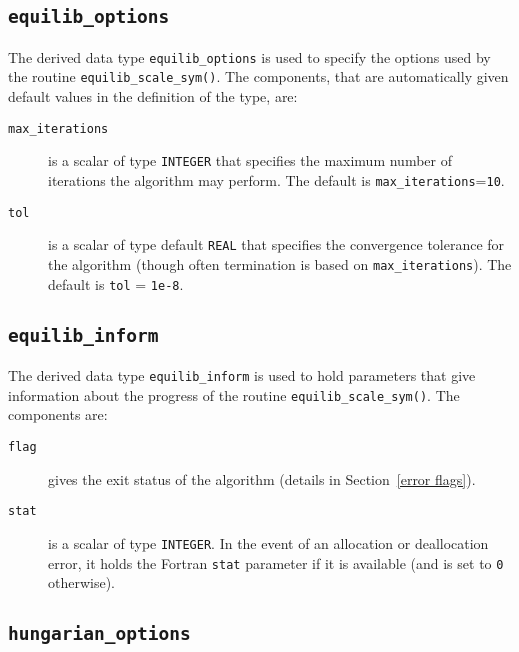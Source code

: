 \subsection{\texttt{equilib\_options}} \label{type:equilib_options}

The derived data type \texttt{equilib\_options} is used to specify the options
used by the routine \texttt{equilib\_scale\_sym()}. The components, that are
automatically given default values in the definition of the type, are:

\begin{description}

\item[\texttt{max\_iterations}] is a scalar of type \texttt{INTEGER} that specifies the maximum number of iterations the algorithm may perform. The default is \texttt{max\_iterations}=\texttt{10}.

\item[\texttt{tol}] is a scalar of type default \texttt{REAL} that specifies the convergence tolerance for the algorithm (though often termination is based on \texttt{max\_iterations}). The default is \texttt{tol} = \texttt{1e-8}.

\end{description}

\subsection{\texttt{equilib\_inform}} \label{type:equilib_inform}

The derived data type \texttt{equilib\_inform} is used to hold parameters that
give information about the progress of the routine
\texttt{equilib\_scale\_sym()}. The components are:

\begin{description}

\item[\texttt{flag}] gives the exit status of the algorithm (details in Section~\ref{error flags}).

\item[\texttt{stat}] is a scalar of type \texttt{INTEGER}. In the event of an allocation or deallocation error, it holds the Fortran \texttt{stat} parameter if it is available (and is set to \texttt{0} otherwise).
\end{description}

\subsection{\texttt{hungarian\_options}} \label{type:hungarian_options}

